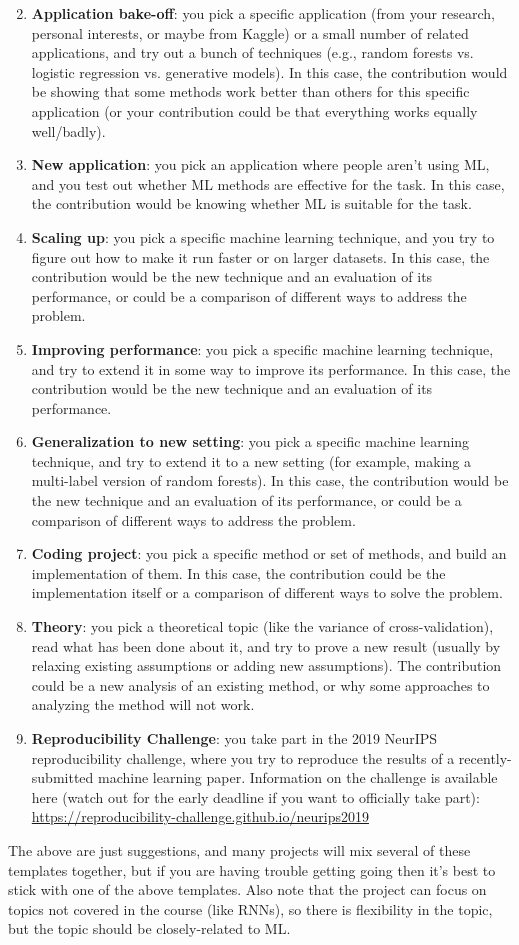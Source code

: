 \documentclass{article}
\def\enum#1{\begin{enumerate}#1\end{enumerate}}
\begin{document}
\enum{
\setcounter{enumi}{1}
\item \textbf{Application bake-off}: you pick a specific application (from your research, personal interests, or maybe from Kaggle) or a small number of related applications, and try out a bunch of techniques (e.g., random forests vs. logistic regression vs. generative models). In this case, the contribution would be showing that some methods work better than others for this specific application (or your contribution could be that everything works equally well/badly).
\item \textbf{New application}: you pick an application where people aren't using ML, and you test out whether ML methods are effective for the task. In this case, the contribution would be knowing whether ML is suitable for the task.
\item \textbf{Scaling up}: you pick a specific machine learning technique, and you try to figure out how to make it run faster or on larger datasets. In this case, the contribution would be the new technique and an evaluation of its performance, or could be a comparison of different ways to address the problem.
\item \textbf{Improving performance}: you pick a specific machine learning technique, and try to extend it in some way to improve its performance. In this case, the contribution would be the new technique and an evaluation of its performance.
\item \textbf{Generalization to new setting}: you pick a specific machine learning technique, and try to extend it to a new setting (for example, making a multi-label version of random forests).  In this case, the contribution would be the new technique and an evaluation of its performance, or could be a comparison of different ways to address the problem.
\item \textbf{Coding project}: you pick a specific method or set of methods, and build an implementation of them. In this case, the contribution could be the implementation itself or a comparison of different ways to solve the problem.
\item \textbf{Theory}: you pick a theoretical topic (like the variance of cross-validation), read what has been done about it, and try to prove a new result (usually by relaxing existing assumptions or adding new assumptions). The contribution could be a new analysis of an existing method, or why some approaches to analyzing the method will not work.
\item \textbf{Reproducibility Challenge}: you take part in the 2019 NeurIPS reproducibility challenge, where you try to reproduce the results of a recently-submitted machine learning paper. Information on the challenge is available here (watch out for the early deadline if you want to officially take part): \\\url{https://reproducibility-challenge.github.io/neurips2019}
}
The above are just suggestions, and many projects will mix several of these templates together, but if you are having trouble getting going then it's best to stick with one of the above templates. Also note that the project can focus on topics not covered in the course (like RNNs), so there is flexibility in the topic, but the topic should be closely-related to ML.
\end{document}
